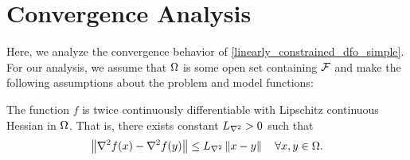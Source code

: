 



\section{Convergence Analysis}
\label{linear_convergence_discussion}
 
Here,  we analyze the convergence behavior of \cref{linearly_constrained_dfo_simple}.
For our analysis, we assume that $\Omega$ is some open set containing ${\mathcal F}$ and make the following assumptions about the problem and model functions:

\begin{assumption}
\label{for_fully_quadratic}
\label{lipschitz_hessian}
The function $f$ is twice continuously differentiable with Lipschitz continuous Hessian in $\Omega$.   That is, there exists constant ${L_{\nabla^2}} > 0$ such that 
\begin{align}
\left\|\nabla^2 f(x) - \nabla^2 f(y)\right\| \le {L_{\nabla^2}} \left\|x - y\right\| \quad \forall x, y \in \Omega.
\end{align}
\end{assumption}



